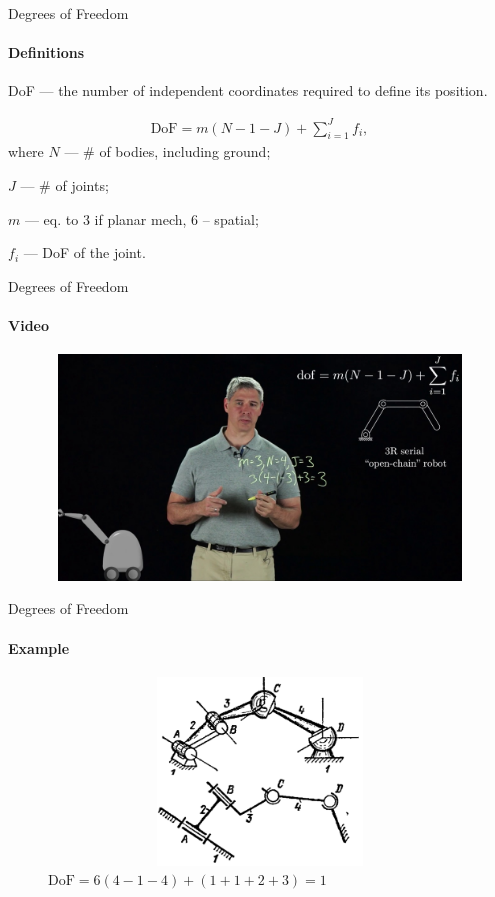 \documentclass[aspectratio=169]{beamer}
\begin{document}
\begin{frame}[t]{Degrees of Freedom}
    \framesubtitle{Definitions}
        DoF --- the number of independent coordinates required to define its position.

        \begin{align*}
            \text{DoF}=m(N-1-J) + \sum_{i=1}^{J}f_i,
        \end{align*}
        where $N$ --- \# of bodies, including ground;
        
        $J$ --- \# of joints;
        
        $m$ --- eq. to 3 if planar mech, 6 -- spatial;
        
        $f_i$ --- DoF of the joint.
    \end{frame}


\begin{frame}[t]{Degrees of Freedom}
    \framesubtitle{Video}
    \vspace{-0.6cm}
    \begin{figure}[H]
        \href{https://youtu.be/zI64DyaRUvQ}{
            \centering\includegraphics[height=6cm,width=1\textwidth,keepaspectratio]{dof_video.jpg}}
        \label{fig:dof_video.jpg}
    \end{figure}
\end{frame}

\begin{frame}[t]{Degrees of Freedom}
    \framesubtitle{Example}
    \vspace{-0.5cm}
    \begin{figure}[H]
            \centering\includegraphics[height=5cm,width=1\textwidth,keepaspectratio]{rus2_mech.png}
            \caption*{$\text{DoF}=6(4-1-4) + (1+1+2+3) = 1$}
    \end{figure}
    \end{frame}
\end{document}
